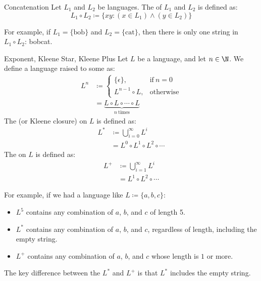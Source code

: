 \begin{dfnbox}{Concatenation}{}
    Let $L_1$ and $L_2$ be languages. The  of $L_1$ and $L_2$ is defined as:
    \[ L_1 \circ L_2 \coloneq \{ xy : (x \in L_1) \land (y \in L_2) \} \]
\end{dfnbox}

For example, if $L_1 = \{\text{bob}\}$ and $L_2 = \{\text{cat}\}$, then there is only one string in $L_1 \circ L_2$: bobcat.

\begin{dfnbox}{Exponent, Kleene Star, Kleene Plus}{}
    Let $L$ be a language, and let $n \in \N$. We define a language raised to some  as:
    \begin{align*}
        L^n &\coloneq \begin{cases}
            \{\epsilon\}, & \text{if}\ n = 0  \\
            L^{n-1} \circ L, & \text{otherwise}
        \end{cases} \\
        &= \underbrace{L \circ L \circ \cdots \circ L}_{n\ \text{times}}
    \end{align*}
    The  (or Kleene closure) on $L$ is defined as:
    \begin{align*}
        L^* &\coloneq \bigcup_{i = 0}^\infty L^i \\
        &= L^0 \circ L^1 \circ L^2 \circ \cdots
    \end{align*}
    The  on $L$ is defined as:
    \begin{align*}
        L^+ &\coloneq \bigcup_{i = 1}^\infty L^i \\
        &= L^1 \circ L^2 \circ \cdots
    \end{align*}
\end{dfnbox}

For example, if we had a language like $L \coloneq \{a,b,c\}$:
\begin{itemize}[noitemsep]
    \item $L^5$ contains any combination of $a$, $b$, and $c$ of length 5.
    \item $L^*$ contains any combination of $a$, $b$, and $c$, regardless of length, including the empty string.
    \item $L^+$ contains any combination of $a$, $b$, and $c$ whose length is $1$ or more.
\end{itemize}
The key difference between the $L^*$ and $L^+$ is that $L^*$ includes the empty string.


